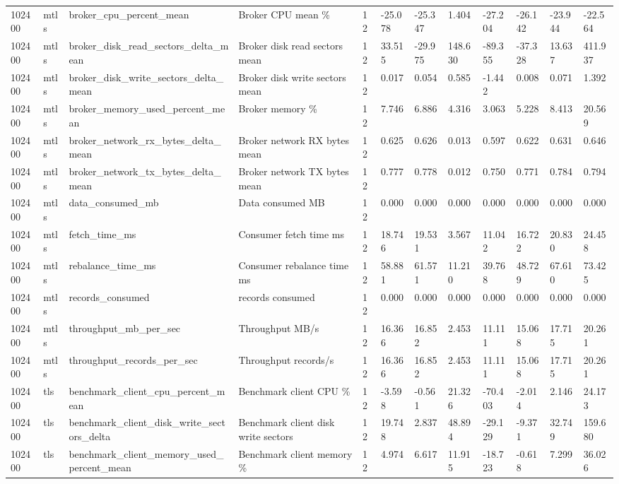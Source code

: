 \begin{longtable}{llllllllllll}
102400 & mtls & broker\_cpu\_percent\_mean & Broker CPU mean \% & 12 & -25.078 & -25.347 & 1.404 & -27.204 & -26.142 & -23.944 & -22.564 \\
102400 & mtls & broker\_disk\_read\_sectors\_delta\_mean & Broker disk read sectors mean & 12 & 33.515 & -29.975 & 148.630 & -89.355 & -37.328 & 13.637 & 411.937 \\
102400 & mtls & broker\_disk\_write\_sectors\_delta\_mean & Broker disk write sectors mean & 12 & 0.017 & 0.054 & 0.585 & -1.442 & 0.008 & 0.071 & 1.392 \\
102400 & mtls & broker\_memory\_used\_percent\_mean & Broker memory \% & 12 & 7.746 & 6.886 & 4.316 & 3.063 & 5.228 & 8.413 & 20.569 \\
102400 & mtls & broker\_network\_rx\_bytes\_delta\_mean & Broker network RX bytes mean & 12 & 0.625 & 0.626 & 0.013 & 0.597 & 0.622 & 0.631 & 0.646 \\
102400 & mtls & broker\_network\_tx\_bytes\_delta\_mean & Broker network TX bytes mean & 12 & 0.777 & 0.778 & 0.012 & 0.750 & 0.771 & 0.784 & 0.794 \\
102400 & mtls & data\_consumed\_mb & Data consumed MB & 12 & 0.000 & 0.000 & 0.000 & 0.000 & 0.000 & 0.000 & 0.000 \\
102400 & mtls & fetch\_time\_ms & Consumer fetch time ms & 12 & 18.746 & 19.531 & 3.567 & 11.042 & 16.722 & 20.830 & 24.458 \\
102400 & mtls & rebalance\_time\_ms & Consumer rebalance time ms & 12 & 58.881 & 61.571 & 11.210 & 39.768 & 48.729 & 67.610 & 73.425 \\
102400 & mtls & records\_consumed & records consumed & 12 & 0.000 & 0.000 & 0.000 & 0.000 & 0.000 & 0.000 & 0.000 \\
102400 & mtls & throughput\_mb\_per\_sec & Throughput MB/s & 12 & 16.366 & 16.852 & 2.453 & 11.111 & 15.068 & 17.715 & 20.261 \\
102400 & mtls & throughput\_records\_per\_sec & Throughput records/s & 12 & 16.366 & 16.852 & 2.453 & 11.111 & 15.068 & 17.715 & 20.261 \\
102400 & tls & benchmark\_client\_cpu\_percent\_mean & Benchmark client CPU \% & 12 & -3.598 & -0.561 & 21.326 & -70.403 & -2.014 & 2.146 & 24.173 \\
102400 & tls & benchmark\_client\_disk\_write\_sectors\_delta & Benchmark client disk write sectors & 12 & 19.748 & 2.837 & 48.894 & -29.129 & -9.371 & 32.749 & 159.680 \\
102400 & tls & benchmark\_client\_memory\_used\_percent\_mean & Benchmark client memory \% & 12 & 4.974 & 6.617 & 11.915 & -18.723 & -0.618 & 7.299 & 36.026 \\

\end{longtable}
